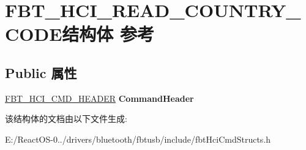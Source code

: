 \hypertarget{struct_f_b_t___h_c_i___r_e_a_d___c_o_u_n_t_r_y___c_o_d_e}{}\section{F\+B\+T\+\_\+\+H\+C\+I\+\_\+\+R\+E\+A\+D\+\_\+\+C\+O\+U\+N\+T\+R\+Y\+\_\+\+C\+O\+D\+E结构体 参考}
\label{struct_f_b_t___h_c_i___r_e_a_d___c_o_u_n_t_r_y___c_o_d_e}
\subsection*{Public 属性}
\begin{DoxyCompactItemize}
\item 
\mbox{\label{struct_f_b_t___h_c_i___r_e_a_d___c_o_u_n_t_r_y___c_o_d_e_aa805de278e735ba8648d8a04beae4860}} 
\hyperlink{struct_f_b_t___h_c_i___c_m_d___h_e_a_d_e_r}{F\+B\+T\+\_\+\+H\+C\+I\+\_\+\+C\+M\+D\+\_\+\+H\+E\+A\+D\+ER} {\bfseries Command\+Header}
\end{DoxyCompactItemize}


该结构体的文档由以下文件生成\+:\begin{DoxyCompactItemize}
\item 
E\+:/\+React\+O\+S-\/0../drivers/bluetooth/fbtusb/include/fbt\+Hci\+Cmd\+Structs.\+h\end{DoxyCompactItemize}
